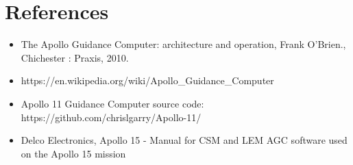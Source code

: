 \documentclass[a4paper,11pt]{article}
\begin{document}

\section{References}

\begin{itemize}
  \item The Apollo Guidance Computer: architecture and operation, Frank O'Brien., Chichester : Praxis, 2010.
  \item https://en.wikipedia.org/wiki/Apollo\_Guidance\_Computer
  \item Apollo 11 Guidance Computer source code: https://github.com/chrislgarry/Apollo-11/
  \item Delco Electronics, Apollo 15 - Manual for CSM and LEM AGC software used on the Apollo 15 mission
\end{itemize}
\end{document}
